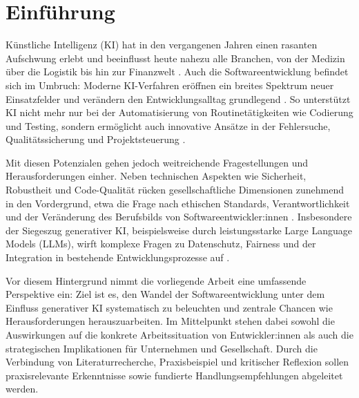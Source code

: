 \chapter{Einführung}


Künstliche Intelligenz (KI) hat in den vergangenen Jahren einen rasanten
Aufschwung erlebt und beeinflusst heute nahezu alle Branchen, von der Medizin
über die Logistik bis hin zur Finanzwelt \cite{a_ki_2024, s_future_2024}. Auch
die Softwareentwicklung befindet sich im Umbruch: Moderne KI-Verfahren eröffnen
ein breites Spektrum neuer Einsatzfelder und verändern den Entwicklungsalltag
grundlegend \cite{siebert_generative_2024}. So unterstützt KI nicht mehr nur
bei der Automatisierung von Routinetätigkeiten wie Codierung und Testing,
sondern ermöglicht auch innovative Ansätze in der Fehlersuche,
Qualitätssicherung und Projektsteuerung \cite{a_ki_2024,
    siebert_generative_2024}.

Mit diesen Potenzialen gehen jedoch weitreichende Fragestellungen und
Herausforderungen einher. Neben technischen Aspekten wie Sicherheit, Robustheit
und Code-Qualität rücken gesellschaftliche Dimensionen zunehmend in den
Vordergrund, etwa die Frage nach ethischen Standards, Verantwortlichkeit und
der Veränderung des Berufsbilds von Softwareentwickler:innen
\cite{braun_ki_2024, schmitt_generative_2024, weisz_design_2024}. Insbesondere
der Siegeszug generativer KI, beispielsweise durch leistungsstarke Large
Language Models (LLMs), wirft komplexe Fragen zu Datenschutz, Fairness und der
Integration in bestehende Entwicklungsprozesse auf \cite{s_future_2024,
    weisz_design_2024}.

Vor diesem Hintergrund nimmt die vorliegende Arbeit eine umfassende Perspektive
ein: Ziel ist es, den Wandel der Softwareentwicklung unter dem Einfluss
generativer KI systematisch zu beleuchten und zentrale Chancen wie
Herausforderungen herauszuarbeiten. Im Mittelpunkt stehen dabei sowohl die
Auswirkungen auf die konkrete Arbeitssituation von Entwickler:innen als auch
die strategischen Implikationen für Unternehmen und Gesellschaft. Durch die
Verbindung von Literaturrecherche, Praxisbeispiel und kritischer Reflexion
sollen praxisrelevante Erkenntnisse sowie fundierte Handlungsempfehlungen
abgeleitet werden.


